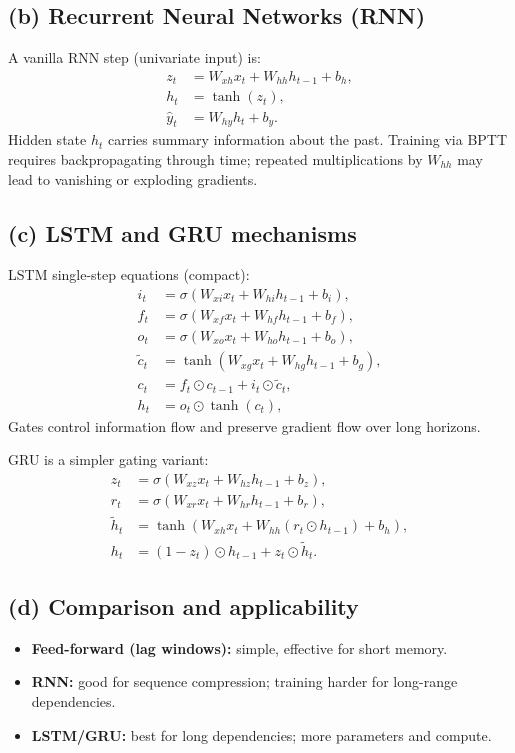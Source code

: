 \documentclass[11pt,a4paper]{article}
\begin{document}
\subsection*{(b) Recurrent Neural Networks (RNN)}
A vanilla RNN step (univariate input) is:
\[
\begin{aligned}
z_t &= W_{xh} x_t + W_{hh} h_{t-1} + b_h,\\
h_t &= \tanh(z_t),\\
\hat y_t &= W_{hy} h_t + b_y.
\end{aligned}
\]
Hidden state \(h_t\) carries summary information about the past. Training
via BPTT requires backpropagating through time; repeated multiplications by
$W_{hh}$ may lead to vanishing or exploding gradients.

\subsection*{(c) LSTM and GRU mechanisms}
LSTM single-step equations (compact):
\[
\begin{aligned}
i_t &= \sigma(W_{xi}x_t + W_{hi}h_{t-1} + b_i),\\
f_t &= \sigma(W_{xf}x_t + W_{hf}h_{t-1} + b_f),\\
o_t &= \sigma(W_{xo}x_t + W_{ho}h_{t-1} + b_o),\\
\tilde c_t &= \tanh(W_{xg}x_t + W_{hg}h_{t-1} + b_g),\\
c_t &= f_t \odot c_{t-1} + i_t \odot \tilde c_t,\\
h_t &= o_t \odot \tanh(c_t),
\end{aligned}
\]
Gates control information flow and preserve gradient flow over long horizons.

GRU is a simpler gating variant:
\[
\begin{aligned}
z_t &= \sigma(W_{xz}x_t + W_{hz}h_{t-1} + b_z),\\
r_t &= \sigma(W_{xr}x_t + W_{hr}h_{t-1} + b_r),\\
\tilde h_t &= \tanh(W_{xh}x_t + W_{hh}(r_t\odot h_{t-1}) + b_h),\\
h_t &= (1-z_t)\odot h_{t-1} + z_t\odot\tilde h_t.
\end{aligned}
\]

\subsection*{(d) Comparison and applicability}
\begin{itemize}
  \item \textbf{Feed-forward (lag windows):} simple, effective for short memory.
  \item \textbf{RNN:} good for sequence compression; training harder for long-range dependencies.
  \item \textbf{LSTM/GRU:} best for long dependencies; more parameters and compute.
\end{itemize}
\end{document}
